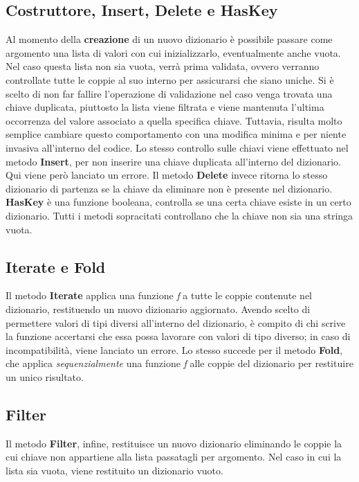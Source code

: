 \documentclass[10pt, italian, openany]{book}
\begin{document}
\subsection{Costruttore, Insert, Delete e HasKey}
Al momento della \textbf{creazione} di un nuovo dizionario è possibile passare come argomento una lista di valori con cui inizializzarlo, eventualmente anche vuota. Nel caso questa lista non sia vuota, verrà prima validata, ovvero verranno controllate tutte le coppie al suo interno per assicurarsi che siano uniche. Si è scelto di non far fallire l'operazione di validazione nel caso venga trovata una chiave duplicata, piuttosto la lista viene filtrata e viene mantenuta l'ultima occorrenza del valore associato a quella specifica chiave. Tuttavia, risulta molto semplice cambiare questo comportamento con una modifica minima e per niente invasiva all'interno del codice.  Lo stesso controllo sulle chiavi viene effettuato nel metodo \textbf{Insert}, per non inserire una chiave duplicata all'interno del dizionario. Qui viene però lanciato un errore. Il metodo \textbf{Delete} invece ritorna lo stesso dizionario di partenza se la chiave da eliminare non è presente nel dizionario. \textbf{HasKey} è una funzione booleana, controlla se una certa chiave esiste in un certo dizionario. Tutti i metodi sopracitati controllano che la chiave non sia una stringa vuota.

\subsection{Iterate e Fold}
Il metodo \textbf{Iterate} applica una funzione \textit{f} a tutte le coppie contenute nel dizionario, restituendo un nuovo dizionario aggiornato. Avendo scelto di permettere valori di tipi diversi all'interno del dizionario, è compito di chi scrive la funzione accertarsi che essa possa lavorare con valori di tipo diverso; in caso di incompatibilità, viene lanciato un errore. Lo stesso succede per il metodo \textbf{Fold}, che applica \textit{sequenzialmente} una funzione \textit{f} alle coppie del dizionario per restituire un unico risultato.

\subsection{Filter}
Il metodo \textbf{Filter}, infine, restituisce un nuovo dizionario eliminando le coppie la cui chiave non appartiene alla lista passatagli per argomento. Nel caso in cui la lista sia vuota, viene restituito un dizionario vuoto.
\end{document}
